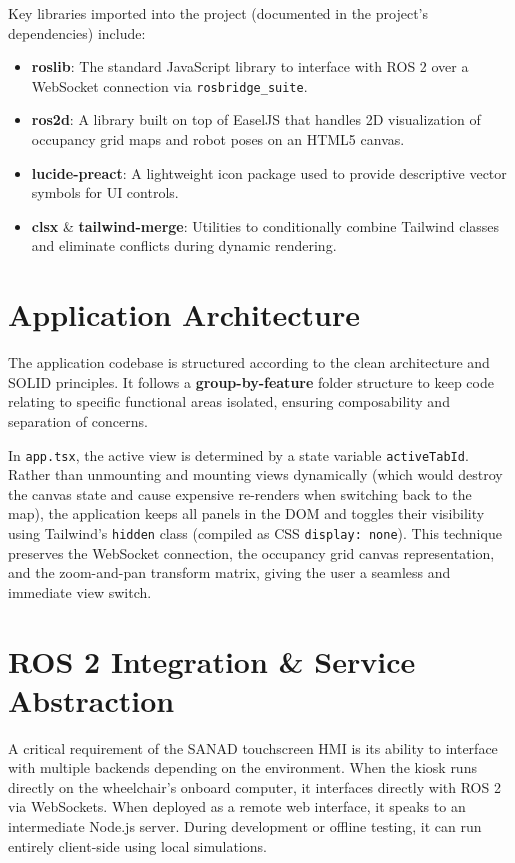 Key libraries imported into the project (documented in the project's dependencies) include:
\begin{itemize}
    \item \textbf{roslib}: The standard JavaScript library to interface with ROS 2 over a WebSocket connection via \texttt{rosbridge\_suite}.
    \item \textbf{ros2d}: A library built on top of EaselJS that handles 2D visualization of occupancy grid maps and robot poses on an HTML5 canvas.
    \item \textbf{lucide-preact}: A lightweight icon package used to provide descriptive vector symbols for UI controls.
    \item \textbf{clsx} \& \textbf{tailwind-merge}: Utilities to conditionally combine Tailwind classes and eliminate conflicts during dynamic rendering.
\end{itemize}


\section{Application Architecture}
The application codebase is structured according to the clean architecture and SOLID principles. It follows a \textbf{group-by-feature} folder structure to keep code relating to specific functional areas isolated, ensuring composability and separation of concerns.

In \texttt{app.tsx}, the active view is determined by a state variable \texttt{activeTabId}. Rather than unmounting and mounting views dynamically (which would destroy the canvas state and cause expensive re-renders when switching back to the map), the application keeps all panels in the DOM and toggles their visibility using Tailwind's \texttt{hidden} class (compiled as CSS \texttt{display: none}). This technique preserves the WebSocket connection, the occupancy grid canvas representation, and the zoom-and-pan transform matrix, giving the user a seamless and immediate view switch.


\section{ROS 2 Integration \& Service Abstraction}
A critical requirement of the SANAD touchscreen HMI is its ability to interface with multiple backends depending on the environment. When the kiosk runs directly on the wheelchair's onboard computer, it interfaces directly with ROS 2 via WebSockets. When deployed as a remote web interface, it speaks to an intermediate Node.js server. During development or offline testing, it can run entirely client-side using local simulations.

